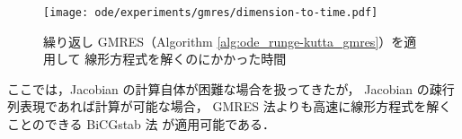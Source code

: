 \begin{figure}[tp]
    \centering
    \texttt{[image: ode/experiments/gmres/dimension-to-time.pdf]}
    \caption{繰り返し GMRES（Algorithm \ref{alg:ode_runge-kutta_gmres}）を適用して%
        線形方程式を解くのにかかった時間}
    \label{fig:ode_runge-kutta_gmres_subspace-dimension-to-processing-time}
\end{figure}

ここでは，Jacobian の計算自体が困難な場合を扱ってきたが，
Jacobian の疎行列表現であれば計算が可能な場合，
GMRES 法よりも高速に線形方程式を解くことのできる BiCGstab 法 \cite{Golub2013} が適用可能である．

\clearpage
